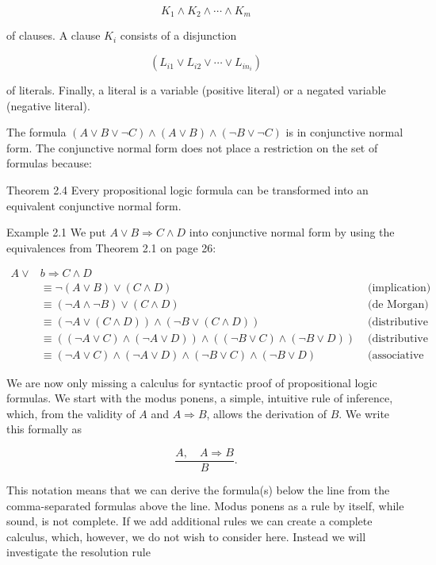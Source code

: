 \documentclass[10pt]{book}
\begin{document}
$$
K_{1} \wedge K_{2} \wedge \cdots \wedge K_{m}
$$

of clauses. A clause $K_{i}$ consists of a disjunction

$$
\left(L_{i 1} \vee L_{i 2} \vee \cdots \vee L_{i n_{i}}\right)
$$

of literals. Finally, a literal is a variable (positive literal) or a negated variable (negative literal).

The formula $(A \vee B \vee \neg C) \wedge(A \vee B) \wedge(\neg B \vee \neg C)$ is in conjunctive normal form. The conjunctive normal form does not place a restriction on the set of formulas because:

Theorem 2.4 Every propositional logic formula can be transformed into an equivalent conjunctive normal form.

Example 2.1 We put $A \vee B \Rightarrow C \wedge D$ into conjunctive normal form by using the equivalences from Theorem 2.1 on page 26:

$$
\begin{array}{rlr}
A \vee & b \Rightarrow C \wedge D & \\
& \equiv \neg(A \vee B) \vee(C \wedge D) & \text { (implication) } \\
& \equiv(\neg A \wedge \neg B) \vee(C \wedge D) & \text { (de Morgan) } \\
& \equiv(\neg A \vee(C \wedge D)) \wedge(\neg B \vee(C \wedge D)) & \text { (distributive law) } \\
& \equiv((\neg A \vee C) \wedge(\neg A \vee D)) \wedge((\neg B \vee C) \wedge(\neg B \vee D)) & \text { (distributive law) } \\
& \equiv(\neg A \vee C) \wedge(\neg A \vee D) \wedge(\neg B \vee C) \wedge(\neg B \vee D) & \text { (associative law) }
\end{array}
$$

We are now only missing a calculus for syntactic proof of propositional logic formulas. We start with the modus ponens, a simple, intuitive rule of inference, which, from the validity of $A$ and $A \Rightarrow B$, allows the derivation of $B$. We write this formally as

$$
\frac{A, \quad A \Rightarrow B}{B} .
$$

This notation means that we can derive the formula(s) below the line from the comma-separated formulas above the line. Modus ponens as a rule by itself, while sound, is not complete. If we add additional rules we can create a complete calculus, which, however, we do not wish to consider here. Instead we will investigate the resolution rule
\end{document}
